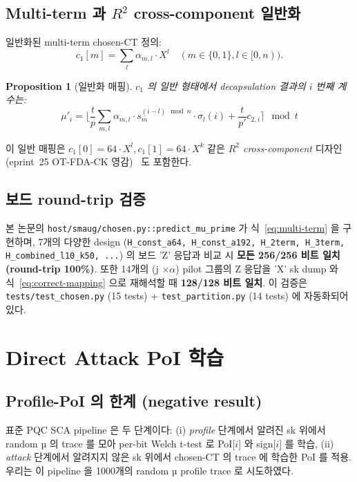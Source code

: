\documentclass[11pt]{article}
\theoremstyle{plain}
\newtheorem{proposition}[theorem]{Proposition}
\theoremstyle{definition}
\theoremstyle{remark}
\newcommand{\round}[1]{\lfloor #1 \rceil}
\begin{document}
\subsection{Multi-term 과 $R^2$ cross-component 일반화}

일반화된 multi-term chosen-CT 정의:
$$
c_1[m] = \sum_l \alpha_{m,l} \cdot X^l \quad (m \in \{0, 1\}, l \in [0, n)).
$$
\begin{proposition}[일반화 매핑]
\label{prop:multi-term}
$c_1$ 의 일반 형태에서 decapsulation 결과의 $i$ 번째 계수는:
\begin{equation}
\mu'_i = \round{ \frac{t}{p} \sum_{m, l} \alpha_{m, l} \cdot s_m^{(i-l) \mod n}
   \cdot \sigma_l(i) + \frac{t}{p'} c_{2,i} } \mod t
\label{eq:multi-term}
\end{equation}
\end{proposition}
이 일반 매핑은 $c_1[0] = 64 \cdot X^l, c_1[1] = 64 \cdot X^k$ 같은
\emph{$R^2$ cross-component} 디자인 (eprint~25 OT-FDA-CK 영감)~\citep{donggu025singletrace}
도 포함한다.

\subsection{보드 round-trip 검증}

본 논문의 \texttt{host/smaug/chosen.py::predict\_mu\_prime} 가 식~\eqref{eq:multi-term}
을 구현하며, 7개의 다양한 design (\texttt{H\_const\_a64, H\_const\_a192,
H\_2term, H\_3term, H\_combined\_l10\_k50, ...}) 의 보드 'Z' 응답과 비교 시
\textbf{모든 256/256 비트 일치 (round-trip 100\%)}.
또한 14개의 (j $\times \alpha$) pilot 그룹의 Z 응답을 'X' sk dump 와
식~\eqref{eq:correct-mapping} 으로 재해석할 때 \textbf{128/128 비트 일치}.
이 검증은 \texttt{tests/test\_chosen.py} (15 tests) + \texttt{test\_partition.py}
(14 tests) 에 자동화되어 있다.

\section{Direct Attack PoI 학습}
\label{sec:directpoi}

\subsection{Profile-PoI 의 한계 (negative result)}

표준 PQC SCA pipeline 은 두 단계이다: (i) \emph{profile} 단계에서 알려진 sk
위에서 random µ 의 trace 를 모아 per-bit Welch t-test 로 PoI[$i$] 와 sign[$i$]
를 학습, (ii) \emph{attack} 단계에서 알려지지 않은 sk 위에서 chosen-CT 의
trace 에 학습한 PoI 를 적용. 우리는 이 pipeline 을 1000개의 random µ profile
trace 로 시도하였다.
\end{document}
